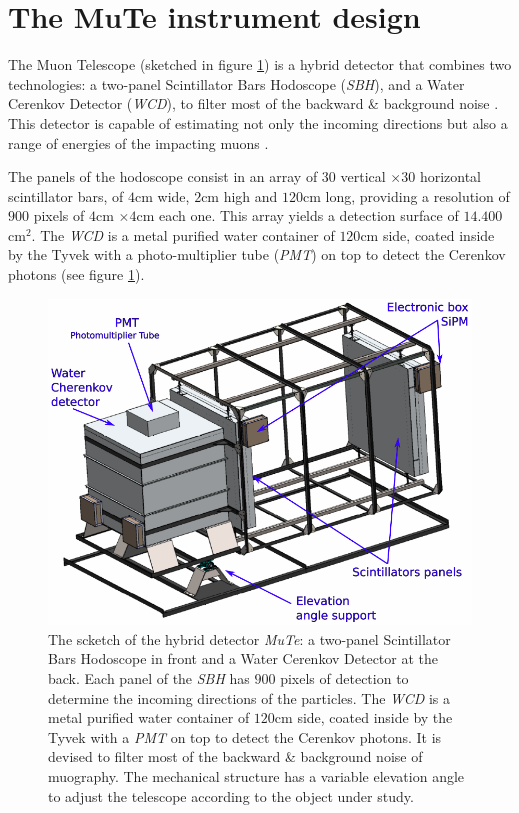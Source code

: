 \documentclass[submitting]{nst}
\begin{document}
\section{The MuTe instrument design}
The Muon Telescope (sketched in figure \ref{fig:mute-detector}) is a hybrid detector that combines two technologies: a two-panel Scintillator Bars Hodoscope (\textsl{SBH}), and a Water Cerenkov Detector (\textsl{WCD}), to filter most of the backward \& background noise \cite{NishiyamaMiyamotoNaganawa2014, KusagayaTanaka2015, NishiyamaEtal2016, GomezEtal2017}. This detector is capable of estimating not only the incoming  directions but also a range of energies of the impacting muons \cite{AsoreyEtal2017B}.
  
 The panels of the hodoscope consist in an array of $30$ vertical $\times 30$ horizontal scintillator bars, of $4$cm wide, $2$cm high and $120$cm long, providing a resolution of $900$ pixels of $4$cm $\times 4$cm each one. This array yields a detection surface of $14.400$cm$^2$. The \textsl{WCD} is a metal purified water container of $120$cm side, coated inside by the Tyvek with a photo-multiplier tube (\textsl{PMT}) on top to detect the Cerenkov photons (see figure \ref{fig:mute-detector}).

\begin{figure}
    \centering
    \includegraphics[scale=0.3]{Figures/mute-detector.png}
    \caption{The scketch of the hybrid detector \textsl{MuTe}: a two-panel Scintillator Bars Hodoscope in front and a Water Cerenkov Detector at the back. Each panel of the \textsl{SBH} has $900$ pixels of detection to determine the incoming directions of the particles. The \textsl{WCD} is a metal purified water container of $120$cm side, coated inside by the Tyvek with a \textsl{PMT} on top to detect the Cerenkov photons. It is devised to filter most of the backward \& background noise of muography. The mechanical structure has a variable elevation angle to adjust the telescope according to the object under study.} 
    \label{fig:mute-detector}
\end{figure}
\end{document}
